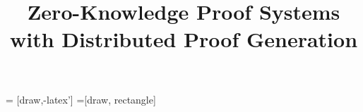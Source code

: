 \documentclass[runningheads]{llncs}
\title{Zero-Knowledge Proof Systems with Distributed Proof Generation}
\begin{document}
\maketitle

 = [draw,-latex']
=[draw, rectangle]



















%
%
%
%
%



	
\end{document}
